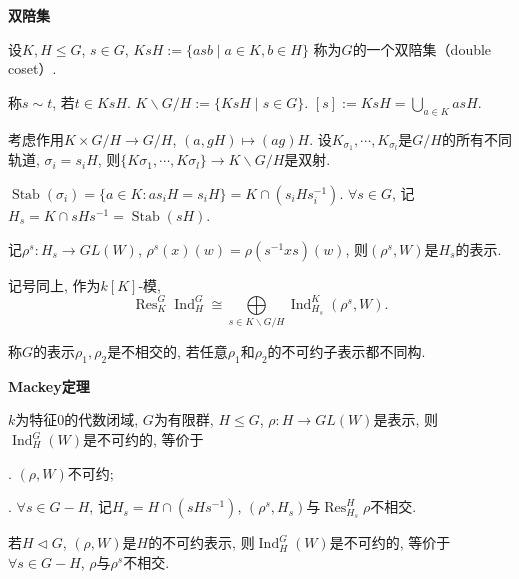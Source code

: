 \begin{definition} \textbf{双陪集}\par
    \qquad 设$K,H\leq G$, $s\in G$, $KsH:=\{asb\mid a\in K, b\in H\}$
    称为$G$的一个双陪集（double coset）. \par
    \qquad 称$s\sim t$, 若$t\in KsH$. $K\backslash G/H:=\{KsH\mid s\in G\}$. 
    $[s]:=KsH=\bigcup\limits_{a\in K} asH$.\par
    \qquad 考虑作用$K\times G/H\rightarrow G/H$, $(a,gH)\mapsto (ag)H$. 
    设$K_{\sigma_1},\cdots,K_{\sigma_l}$是$G/H$的所有不同轨道, $\sigma_i=s_iH$, 
    则$\{K\sigma_1,\cdots, K\sigma_l\}\rightarrow K\backslash G/H$是双射.\par
    \qquad $\operatorname{Stab}(\sigma_i)
    =\{a\in K:as_iH=s_iH\}=K\cap (s_iHs_i^{-1})$. 
    $\forall s\in G$, 记$H_s=K\cap sHs^{-1}=\operatorname{Stab}(sH)$.\par
    \qquad 记$\rho^s:H_s\rightarrow GL(W)$, $\rho^s(x)(w)=\rho(s^{-1}xs)(w)$, 
    则$(\rho^s,W)$是$H_s$的表示.
\end{definition}

\begin{proposition}
    记号同上, 作为$k[K]$-模,
        $$\operatorname{Res}_K^G\operatorname{Ind}_H^G\cong 
        \bigoplus\limits_{s\in K\backslash G/H} \operatorname{Ind}^K_{H_s} (\rho^s,W).$$
\end{proposition}

\begin{definition}
    称$G$的表示$\rho_1,\rho_2$是不相交的, 
    若任意$\rho_1$和$\rho_2$的不可约子表示都不同构.
\end{definition}

\begin{theorem} \textbf{Mackey定理}\par
    \qquad $k$为特征$0$的代数闭域, $G$为有限群, $H\leq G$, 
    $\rho:H\rightarrow GL(W)$是表示, 
    则$\operatorname{Ind}_H^G(W)$是不可约的, 等价于\par
    . $(\rho,W)$不可约;\par
    . $\forall s\in G-H$, 记$H_s=H\cap (sHs^{-1})$, 
    $(\rho^s,H_s)$与$\operatorname{Res}_{H_s}^H\rho$不相交.
\end{theorem}

\begin{corollary}
    若$H\lhd G$, $(\rho,W)$是$H$的不可约表示, 
    则$\operatorname{Ind}_H^G(W)$是不可约的, 
    等价于 $\forall s\in G-H$, $\rho$与$\rho^s$不相交.
\end{corollary}

